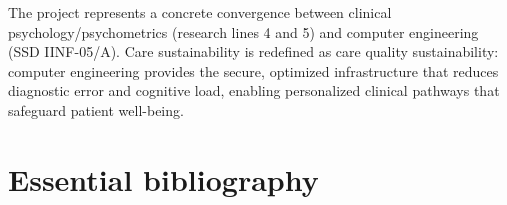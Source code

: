 \documentclass[11pt,a4paper]{article}
\begin{document}
The project represents a concrete convergence between clinical psychology/psychometrics (research lines 4 and 5) and computer engineering (SSD IINF-05/A). Care sustainability is redefined as care quality sustainability: computer engineering provides the secure, optimized infrastructure that reduces diagnostic error and cognitive load, enabling personalized clinical pathways that safeguard patient well-being.

\section{Essential bibliography}
\end{document}

